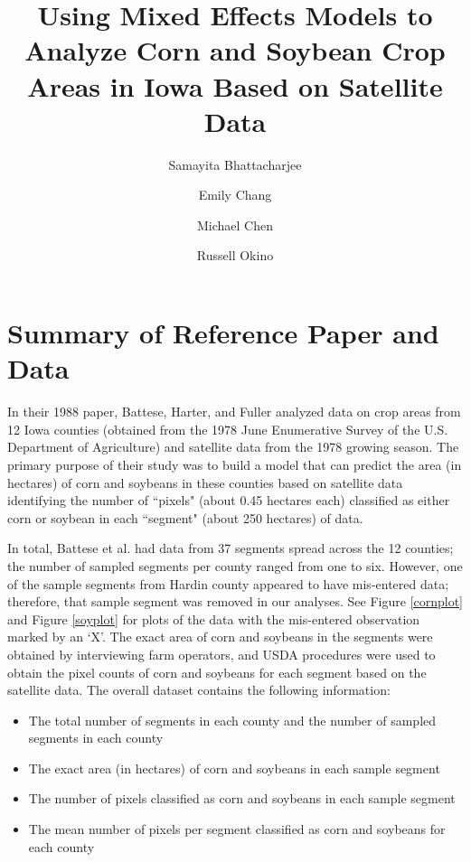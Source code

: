 \documentclass{article}
\begin{document}
\title{Using Mixed Effects Models to Analyze Corn and Soybean Crop Areas in Iowa Based on Satellite Data}
\author{Samayita Bhattacharjee
\and Emily Chang
\and Michael Chen
\and Russell Okino}

\maketitle

\section{Summary of Reference Paper and Data}

In their 1988 paper, Battese, Harter, and Fuller \cite{battese} analyzed data on crop areas from 12 Iowa counties (obtained from the 1978 June Enumerative Survey of the U.S. Department of Agriculture) and satellite data from the 1978 growing season. The primary purpose of their study was to build a model that can predict the area (in hectares) of corn and soybeans in these counties based on satellite data identifying the number of ``pixels" (about 0.45 hectares each) classified as either corn or soybean in each ``segment" (about 250 hectares) of data.
\medbreak

In total, Battese et al. had data from 37 segments spread across the 12 counties; the number of sampled segments per county ranged from one to six. However, one of the sample segments from Hardin county appeared to have mis-entered data; therefore, that sample segment was removed in our analyses. See Figure \ref{cornplot} and Figure \ref{soyplot} for plots of the data with the mis-entered observation marked by an `X'. The exact area of corn and soybeans in the segments were obtained by interviewing farm operators, and USDA procedures were used to obtain the pixel counts of corn and soybeans for each segment based on the satellite data. The overall dataset contains the following information:

\begin{itemize}
	\item The total number of segments in each county and the number of sampled segments in each county
	\item The exact area (in hectares) of corn and soybeans in each sample segment
	\item The number of pixels classified as corn and soybeans in each sample segment
	\item The mean number of pixels per segment classified as corn and soybeans for each county
\end{itemize}
\end{document}
